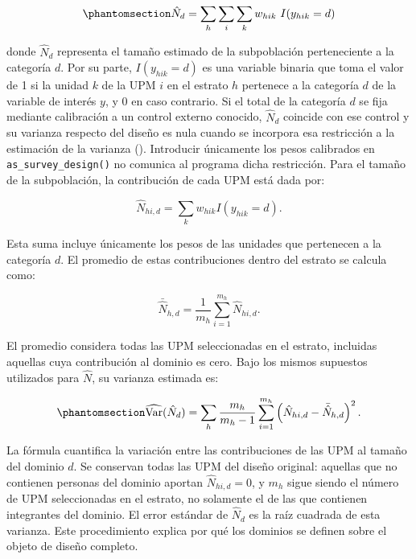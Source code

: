 \documentclass[
  spanish,
  11pt,
  letterpaper,
  oneside,
  open=any]{scrbook}
\begin{document}
\begin{equation}\protect\phantomsection\label{eq-tamano-dominio}{
\hat{N}_d
=
\sum_{h}
\sum_{i}
\sum_{k}
w_{hik} \ 
I(y_{hik}=d)
}\end{equation}

donde \(\hat{N}_d\) representa el tamaño estimado de la subpoblación
perteneciente a la categoría \(d\). Por su parte, \(I(y_{hik}=d)\) es
una variable binaria que toma el valor de 1 si la unidad \(k\) de la UPM
\(i\) en el estrato \(h\) pertenece a la categoría \(d\) de la variable
de interés \(y\), y 0 en caso contrario. Si el total de la categoría
\(d\) se fija mediante calibración a un control externo conocido,
\(\hat{N}_d\) coincide con ese control y su varianza respecto del diseño
es nula cuando se incorpora esa restricción a la estimación de la
varianza (\citeproc{ref-Gutierrez2016}{Gutiérrez 2016}). Introducir
únicamente los pesos calibrados en \texttt{as\_survey\_design()} no
comunica al programa dicha restricción. Para el tamaño de la
subpoblación, la contribución de cada UPM está dada por:

\[
\hat{N}_{hi,d}=\sum_k w_{hik}I(y_{hik}=d).
\]

Esta suma incluye únicamente los pesos de las unidades que pertenecen a
la categoría \(d\). El promedio de estas contribuciones dentro del
estrato se calcula como:

\[
\bar{\hat{N}}_{h,d}=\frac{1}{m_h}\sum_{i=1}^{m_h}\hat{N}_{hi,d}.
\]

El promedio considera todas las UPM seleccionadas en el estrato,
incluidas aquellas cuya contribución al dominio es cero. Bajo los mismos
supuestos utilizados para \(\hat{N}\), su varianza estimada es:

\begin{equation}\protect\phantomsection\label{eq-varianza-tamano-dominio}{
\widehat{\operatorname{Var}}(\hat{N}_d)
=
\sum_h \frac{m_h}{m_h-1}
\sum_{i=1}^{m_h}\left(\hat{N}_{hi,d}-\bar{\hat{N}}_{h,d}\right)^2.
}\end{equation}

La fórmula cuantifica la variación entre las contribuciones de las UPM
al tamaño del dominio \(d\). Se conservan todas las UPM del diseño
original: aquellas que no contienen personas del dominio aportan
\(\hat{N}_{hi,d}=0\), y \(m_h\) sigue siendo el número de UPM
seleccionadas en el estrato, no solamente el de las que contienen
integrantes del dominio. El error estándar de \(\hat{N}_d\) es la raíz
cuadrada de esta varianza. Este procedimiento explica por qué los
dominios se definen sobre el objeto de diseño completo.
\end{document}
